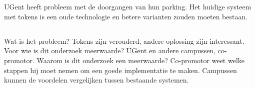 
\chapter{}
\label{ch:inleiding}



UGent heeft probleem met de doorgangen van hun parking. Het huidige systeem met tokens is een oude technologie en betere varianten zouden moeten bestaan.

\section{}
\label{sec:probleemstelling}

Wat is het probleem? Tokens zijn verouderd, andere oplossing zijn interessant.
Voor wie is dit onderzoek meerwaarde? UGent en andere campussen, co-promotor.
Waarom is dit onderzoek een meerwaarde? Co-promotor weet welke stappen hij moet nemen om een goede implementatie te maken. Campussen kunnen de voordelen vergelijken tussen bestaande systemen.

